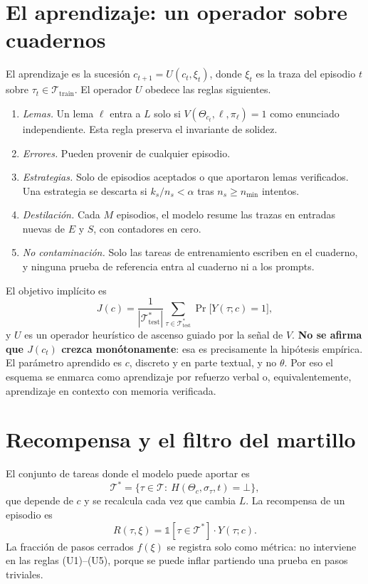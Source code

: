 \documentclass[11pt]{article}
\theoremstyle{remark}
\newcommand{\T}{\mathcal{T}}
\newcommand{\1}{\mathbb{1}}
\begin{document}
\section{El aprendizaje: un operador sobre cuadernos}\label{sec:U}

El aprendizaje es la sucesión $c_{t+1}=U(c_t,\xi_t)$, donde $\xi_t$ es la traza del episodio $t$ sobre $\tau_t\in\T_{\mathrm{train}}$. El operador $U$ obedece las reglas siguientes.
\begin{enumerate}[label=(U\arabic*)]
\item \emph{Lemas.} Un lema $\ell$ entra a $L$ solo si $V(\Theta_{c_t},\ell,\pi_\ell)=1$ como enunciado independiente. Esta regla preserva el invariante de solidez.
\item \emph{Errores.} Pueden provenir de cualquier episodio.
\item \emph{Estrategias.} Solo de episodios aceptados o que aportaron lemas verificados. Una estrategia se descarta si $k_s/n_s<\alpha$ tras $n_s\ge n_{\min}$ intentos.
\item \emph{Destilación.} Cada $M$ episodios, el modelo resume las trazas en entradas nuevas de $E$ y $S$, con contadores en cero.
\item \emph{No contaminación.} Solo las tareas de entrenamiento escriben en el cuaderno, y ninguna prueba de referencia entra al cuaderno ni a los prompts.
\end{enumerate}

El objetivo implícito es
\[
J(c)=\frac{1}{|\T^*_{\mathrm{test}}|}\sum_{\tau\in\T^*_{\mathrm{test}}}\Pr\big[Y(\tau;c)=1\big],
\]
y $U$ es un operador heurístico de ascenso guiado por la señal de $V$. \textbf{No se afirma que $J(c_t)$ crezca monótonamente}: esa es precisamente la hipótesis empírica. El parámetro aprendido es $c$, discreto y en parte textual, y no $\theta$. Por eso el esquema se enmarca como aprendizaje por refuerzo verbal \cite{shinn2023} o, equivalentemente, aprendizaje en contexto con memoria verificada.

\section{Recompensa y el filtro del martillo}

El conjunto de tareas donde el modelo puede aportar es
\[
\T^*=\{\tau\in\T:\ H(\Theta_c,\sigma_\tau,t)=\bot\},
\]
que depende de $c$ y se recalcula cada vez que cambia $L$. La recompensa de un episodio es
\[
R(\tau,\xi)=\1[\tau\in\T^*]\cdot Y(\tau;c).
\]
La fracción de pasos cerrados $f(\xi)$ se registra solo como métrica: no interviene en las reglas (U1)--(U5), porque se puede inflar partiendo una prueba en pasos triviales.
\end{document}
